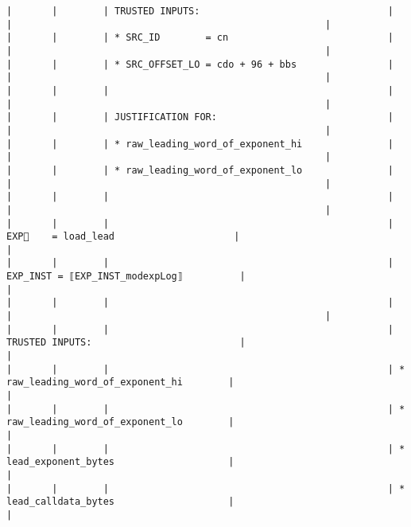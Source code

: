 \documentclass[varwidth=\maxdimen,margin=0.5cm,multi={verbatim}]{standalone}
\begin{document}
\begin{verbatim}
|       |        | TRUSTED INPUTS:                                 |                                          |                                                       |
|       |        | * SRC_ID        = cn                            |                                          |                                                       |
|       |        | * SRC_OFFSET_LO = cdo + 96 + bbs                |                                          |                                                       |
|       |        |                                                 |                                          |                                                       |
|       |        | JUSTIFICATION FOR:                              |                                          |                                                       |
|       |        | * raw_leading_word_of_exponent_hi               |                                          |                                                       |
|       |        | * raw_leading_word_of_exponent_lo               |                                          |                                                       |
|       |        |                                                 |                                          |                                                       |
|       |        |                                                 | EXP🏴    = load_lead                     |                                                       |
|       |        |                                                 | EXP_INST = ⟦EXP_INST_modexpLog⟧          |                                                       |
|       |        |                                                 |                                          |                                                       |
|       |        |                                                 | TRUSTED INPUTS:                          |                                                       |
|       |        |                                                 | * raw_leading_word_of_exponent_hi        |                                                       |
|       |        |                                                 | * raw_leading_word_of_exponent_lo        |                                                       |
|       |        |                                                 | * lead_exponent_bytes                    |                                                       |
|       |        |                                                 | * lead_calldata_bytes                    |                                                       |

\end{verbatim}
\end{document}
